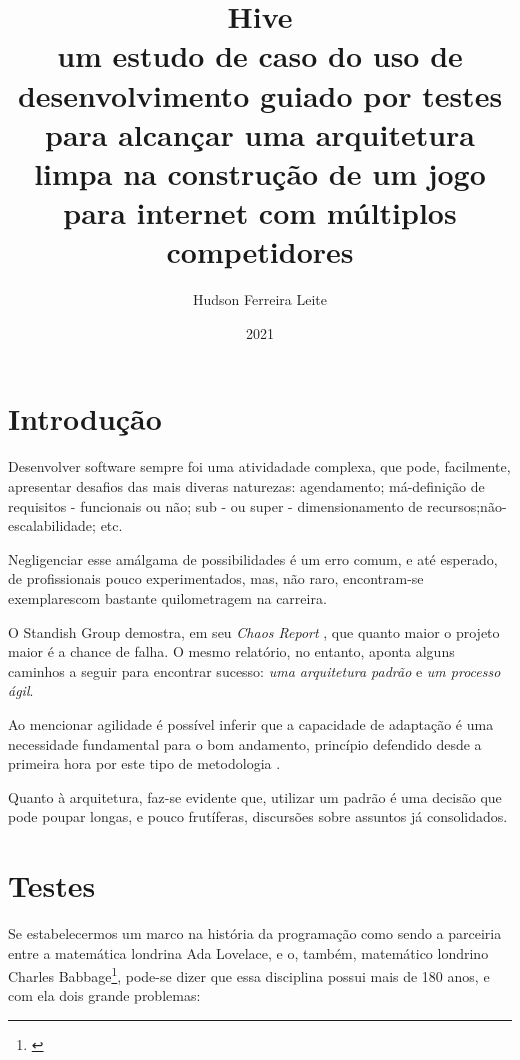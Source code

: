 \documentclass[12pt,a4paper,oneside,english,brazil]{article}
\title{
      \textbf{Hive} \\
      \large um estudo de caso do uso de desenvolvimento guiado por testes para
      alcançar uma arquitetura limpa na construção de um jogo para internet com
      múltiplos competidores
    }
\author{Hudson Ferreira Leite}
\date{2021}
\begin{document}
  \maketitle

  \clearpage

    \renewcommand\refname{Lista de Figuras}

      \listoffigures

  \clearpage

  \section{Introdução}

    Desenvolver software sempre foi uma atividadade complexa, que pode,
    facilmente,  apresentar desafios das mais diveras naturezas: agendamento;
    má-definição de  requisitos - funcionais ou não; sub - ou super -
    dimensionamento de recursos;não-escalabilidade; etc.

    Negligenciar esse amálgama de possibilidades é um erro comum, e até
    esperado,  de profissionais pouco experimentados, mas, não raro, encontram-se
    exemplarescom bastante quilometragem na carreira.

    O Standish Group demostra, em seu \emph{Chaos Report}
    \cite{ChaosReport2015},  que quanto maior o projeto maior é a chance de
    falha. O mesmo relatório, no entanto, aponta alguns caminhos a seguir para
    encontrar sucesso: \emph{uma arquitetura padrão} e \emph{um processo ágil}.

    Ao mencionar agilidade é possível inferir que a capacidade de adaptação é
    uma  necessidade fundamental para o bom andamento, princípio defendido desde
    a  primeira hora por este tipo de metodologia \cite{ManifestoAgil2001}.

    Quanto à  arquitetura, faz-se evidente que, utilizar um padrão é uma decisão
    que  pode poupar longas, e pouco frutíferas, discursões sobre assuntos já
    consolidados.

  \section{Testes}

    Se estabelecermos um marco na história da programação como sendo a parceiria
    entre a matemática londrina Ada Lovelace, e o, também, matemático londrino
    Charles Babbage\footnote{\cite{Huskey1980}}, pode-se dizer que essa
    disciplina possui mais de 180 anos, e com ela dois grande problemas:
\end{document}
